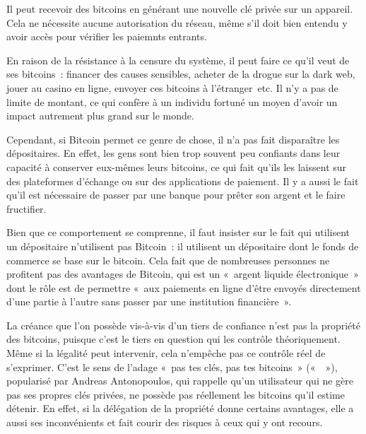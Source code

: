 Il peut recevoir des bitcoins en générant une nouvelle clé privée sur un appareil. Cela ne nécessite aucune autorisation du réseau, même s'il doit bien entendu y avoir accès pour vérifier les paiemnts entrants.

En raison de la résistance à la censure du système, il peut faire ce qu'il veut de ses bitcoins~: financer des causes sensibles, acheter de la drogue sur la dark web, jouer au casino en ligne, envoyer ces bitcoins à l'étranger~etc. Il n'y a pas de limite de montant, ce qui confère à un individu fortuné un moyen d'avoir un impact autrement plus grand sur le monde.

Cependant, si Bitcoin permet ce genre de chose, il n'a pas fait disparaître les dépositaires. En effet, les gens sont bien trop souvent peu confiants dans leur capacité à conserver eux-mêmes leurs bitcoins, ce qui fait qu'ils les laissent sur des plateformes d'échange ou sur des applications de paiement. Il y a aussi le fait qu'il est nécessaire de passer par une banque pour prêter son argent et le faire fructifier.

Bien que ce comportement se comprenne, il faut insister sur le fait qui utilisent un dépositaire n'utilisent pas Bitcoin~: il utilisent un dépositaire dont le fonds de commerce se base sur le bitcoin. Cela fait que de nombreuses personnes ne profitent pas des avantages de Bitcoin, qui est un «~argent liquide électronique~» dont le rôle est de permettre «~aux paiements en ligne d'être envoyés directement d'une partie à l'autre sans passer par une institution financière~».

La créance que l'on possède vis-à-vis d'un tiers de confiance n'est pas la propriété des bitcoins, puisque c'est le tiers en question qui les contrôle théoriquement. Même si la légalité peut intervenir, cela n'empêche pas ce contrôle réel de s'exprimer. C'est le sens de l'adage «~pas tes clés, pas tes bitcoins~» («~~»), popularisé par Andreas Antonopoulos, qui rappelle qu'un utilisateur qui ne gère pas ses propres clés privées, ne possède pas réellement les bitcoins qu'il estime détenir. En effet, si la délégation de la propriété donne certains avantages, elle a aussi ses inconvénients et fait courir des risques à ceux qui y ont recours.


